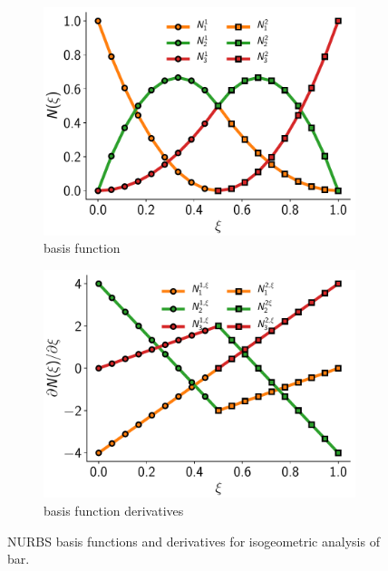 \documentclass[submit,12pt]{aiaa-pretty} %
\begin{document}
\begin{figure}[h] 
  \begin{subfigure}{0.48\textwidth}
    \centering
    \includegraphics[width=1.0\textwidth]{figures/bar-basis-functions.pdf}
    \caption{basis function}
  \end{subfigure}
  \begin{subfigure}{0.48\textwidth}
    \centering
    \includegraphics[width=1.0\textwidth]{figures/bar-basis-function-derivatives.pdf}
    \caption{basis function derivatives}
  \end{subfigure}
  \caption{NURBS basis functions and derivatives for isogeometric
    analysis of bar.}
  \label{fig:nurbs-basis-function-derivatives}
\end{figure}
\end{document}

